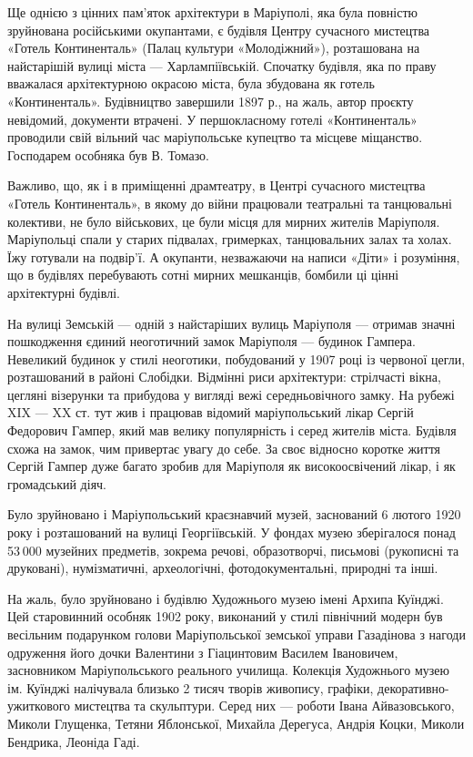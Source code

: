 Ще однією з цінних пам'яток архітектури в Маріуполі, яка була повністю
зруйнована російськими окупантами, є будівля Центру сучасного мистецтва «Готель
Континенталь» (Палац культури «Молодіжний»), розташована на найстарішій вулиці
міста — Харлампіївській. Спочатку будівля, яка по праву вважалася архітектурною
окрасою міста, була збудована як готель «Континенталь». Будівництво завершили
1897 р., на жаль, автор проєкту невідомий, документи втрачені. У першокласному
готелі «Континенталь» проводили свій вільний час маріупольське купецтво та
місцеве міщанство. Господарем особняка був В. Томазо.

Важливо, що, як і в приміщенні драмтеатру, в Центрі сучасного мистецтва «Готель
Континенталь», в якому до війни працювали театральні та танцювальні колективи,
не було військових, це були місця для мирних жителів Маріуполя. Маріупольці
спали у старих підвалах, гримерках, танцювальних залах та холах. Їжу готували
на подвір'ї. А окупанти, незважаючи на написи «Діти» і розуміння, що в будівлях
перебувають сотні мирних мешканців, бомбили ці цінні архітектурні будівлі.

На вулиці Земській — одній з найстаріших вулиць Маріуполя — отримав значні
пошкодження єдиний неоготичний замок Маріуполя — будинок Гампера. Невеликий
будинок у стилі неоготики, побудований у 1907 році із червоної цегли,
розташований в районі Слобідки. Відмінні риси архітектури: стрілчасті вікна,
цегляні візерунки та прибудова у вигляді вежі середньовічного замку. На рубежі
XIX — XX ст. тут жив і працював відомий маріупольський лікар Сергій Федорович
Гампер, який мав велику популярність і серед жителів міста. Будівля схожа на
замок, чим привертає увагу до себе. За своє відносно коротке життя Сергій
Гампер дуже багато зробив для Маріуполя як високоосвічений лікар, і як
громадський діяч. 

Було зруйновано і Маріупольський краєзнавчий музей, заснований 6 лютого 1920
року і розташований на вулиці Георгіївській. У фондах музею зберігалося понад
53 000 музейних предметів, зокрема речові, образотворчі, письмові (рукописні та
друковані), нумізматичні, археологічні, фотодокументальні, природні та інші.

На жаль, було зруйновано і будівлю Художнього музею імені Архипа Куїнджі. Цей
старовинний особняк 1902 року, виконаний у стилі північний модерн був весільним
подарунком голови Маріупольської земської управи Газадінова з нагоди одруження
його дочки Валентини з Гіацинтовим Василем Івановичем, засновником
Маріупольського реального училища. Колекція Художнього музею ім. Куїнджі
налічувала близько 2 тисяч творів живопису, графіки, декоративно-ужиткового
мистецтва та скульптури. Серед них — роботи Івана Айвазовського, Миколи
Глущенка, Тетяни Яблонської, Михайла Дерегуса, Андрія Коцки, Миколи Бендрика,
Леоніда Гаді.

